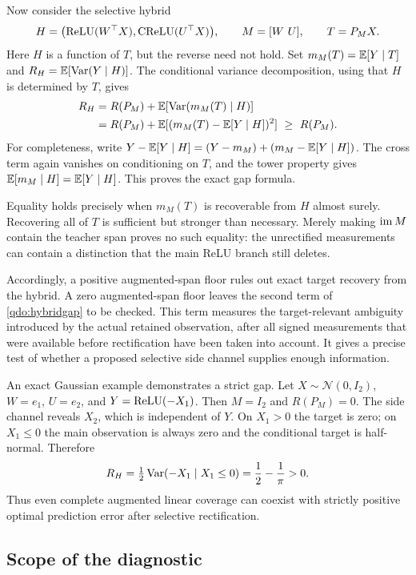 Now consider the selective hybrid
\begin{equation}
 H=\bigl(\operatorname{ReLU}(W^\top X),\operatorname{CReLU}(U^\top X)\bigr),
 \qquad M=[W\ U],\qquad T=P_MX.
 \label{qdo:hybrid}
\end{equation}
Here $H$ is a function of $T$, but the reverse need not hold. Set
$m_M(T)=\mathbb E[Y\mid T]$ and $R_H=\mathbb E[\operatorname{Var}(Y\mid H)]$.
The conditional variance decomposition, using that $H$ is determined by $T$,
gives
\begin{align}
 R_H
 &=R(P_M)+\mathbb E[\operatorname{Var}(m_M(T)\mid H)]\label{qdo:hybridgap}\\
 &=R(P_M)+\mathbb E[(m_M(T)-\mathbb E[Y\mid H])^2]
 \ \ge\ R(P_M).\notag
\end{align}
For completeness, write
$Y-\mathbb E[Y\mid H]=(Y-m_M)+(m_M-\mathbb E[Y\mid H])$.
The cross term again vanishes on conditioning on $T$, and the tower property
gives $\mathbb E[m_M\mid H]=\mathbb E[Y\mid H]$. This proves the exact gap formula.

Equality holds precisely when $m_M(T)$ is recoverable from $H$ almost surely.
Recovering all of $T$ is sufficient but stronger than necessary. Merely
making $\operatorname{im} M$ contain the teacher span proves no such equality: the
unrectified measurements can contain a distinction that the main ReLU branch
still deletes.

Accordingly, a positive augmented-span floor rules out exact target recovery
from the hybrid. A zero augmented-span floor leaves the second term of
\eqref{qdo:hybridgap} to be checked. This term measures the target-relevant
ambiguity introduced by the actual retained observation, after all signed
measurements that were available before rectification have been taken into
account. It gives a precise test of whether a proposed selective side
channel supplies enough information.

An exact Gaussian example demonstrates a strict gap. Let
$X\sim\mathcal N(0,I_2)$, $W=e_1$, $U=e_2$, and
$Y=\operatorname{ReLU}(-X_1)$. Then $M=I_2$ and $R(P_M)=0$. The side channel reveals $X_2$,
which is independent of $Y$. On $X_1>0$ the target is zero; on $X_1\le0$ the
main observation is always zero and the conditional target is half-normal.
Therefore
\begin{equation}
 R_H=\tfrac12\operatorname{Var}(-X_1\mid X_1\le0)
 =\frac12-\frac{1}{\pi}>0.
 \label{qdo:strictgap}
\end{equation}
Thus even complete augmented linear coverage can coexist with strictly
positive optimal prediction error after selective rectification.

\subsection{Scope of the diagnostic}
\label{qdo:scope}

